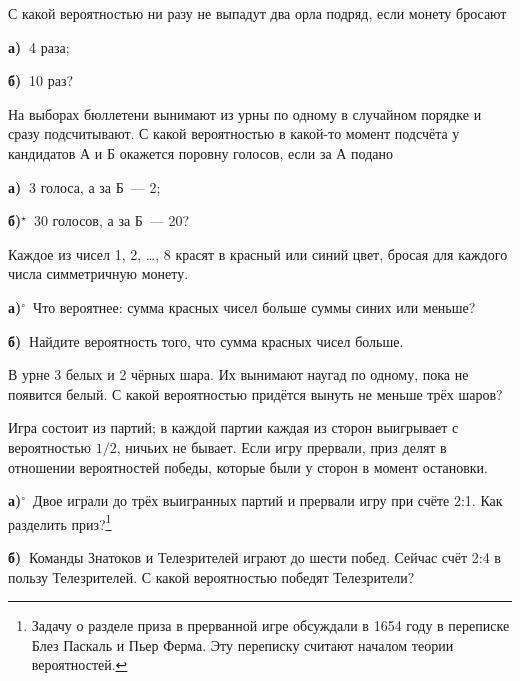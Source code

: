 \documentclass[10pt,a4paper]{article}
\newlength{\shirinaokna}\setlength{\shirinaokna}{12mm}
\newlength{\vysotaokna}\setlength{\vysotaokna}{0.7\baselineskip}
\newcommand{\okno}{\framebox[\shirinaokna]{\rule{0pt}{\vysotaokna}}}
\newlength{\shirinanomera}\setlength{\shirinanomera}{9mm}
\newlength{\zazor}\setlength{\zazor}{0.6em}
\newcommand{\blok}[1]{\par\noindent #1\par}
\newcommand{\nomer}[2]{\makebox[\shirinanomera][l]{%
  \fbox{\rule{0pt}{\vysotaokna}\textbf{#1}$^{#2}$}}}
\newcommand{\zad}[3]{\begin{samepage}\blok{\nomer{#1}{#2}\hspace{\zazor}\okno\hspace{\zazor}#3}\end{samepage}\par\vspace{6pt}}
\newcommand{\punkt}[3]{\par\nopagebreak\blok{\okno\hspace{\zazor}\textbf{#1)}$^{#2}$\ #3}}
\begin{document}
\begin{samepage}
\blok{\nomer{11}{}\hspace{\zazor}С какой вероятностью ни разу не выпадут два орла подряд, если монету бросают}
\punkt{а}{}{4 раза;}
\punkt{б}{}{10 раз?}
\end{samepage}\par\vspace{6pt}

\begin{samepage}
\blok{\nomer{12}{}\hspace{\zazor}На выборах бюллетени вынимают из урны по одному в случайном порядке и сразу подсчитывают. С какой вероятностью в какой-то момент подсчёта у кандидатов А и Б окажется поровну голосов, если за А подано}
\punkt{а}{}{3 голоса, а за Б~— 2;}
\punkt{б}{\star}{30 голосов, а за Б~— 20?}
\end{samepage}\par\vspace{6pt}

\begin{samepage}
\blok{\nomer{13}{}\hspace{\zazor}Каждое из чисел 1, 2, \ldots, 8 красят в красный или синий цвет, бросая для каждого числа симметричную монету.}
\punkt{а}{\circ}{Что вероятнее: сумма красных чисел больше суммы синих или меньше?}
\punkt{б}{}{Найдите вероятность того, что сумма красных чисел больше.}
\end{samepage}\par\vspace{6pt}

\zad{14}{\circ}{В урне 3 белых и 2 чёрных шара. Их вынимают наугад по одному, пока не появится белый. С какой вероятностью придётся вынуть не меньше трёх шаров?}

\begin{samepage}
\blok{\nomer{15}{}\hspace{\zazor}Игра состоит из партий; в каждой партии каждая из сторон выигрывает с вероятностью $1/2$, ничьих не бывает. Если игру прервали, приз делят в отношении вероятностей победы, которые были у сторон в момент остановки.}
\punkt{а}{\circ}{Двое играли до трёх выигранных партий и прервали игру при счёте 2:1. Как разделить приз?\footnote{Задачу о разделе приза в прерванной игре обсуждали в 1654 году в переписке Блез Паскаль и Пьер Ферма. Эту переписку считают началом теории вероятностей.}}
\punkt{б}{}{Команды Знатоков и Телезрителей играют до шести побед. Сейчас счёт 2:4 в пользу Телезрителей. С какой вероятностью победят Телезрители?}
\end{samepage}\par\vspace{6pt}
\end{document}
